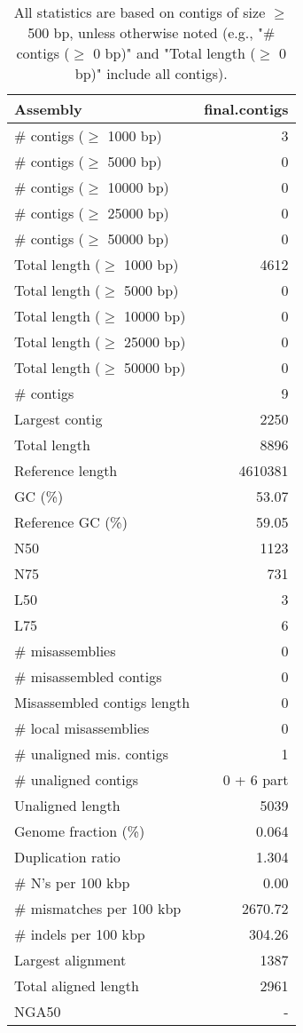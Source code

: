 \documentclass[12pt,a4paper]{article}
\begin{document}
\begin{table}[ht]
\begin{center}
\caption{All statistics are based on contigs of size $\geq$ 500 bp, unless otherwise noted (e.g., "\# contigs ($\geq$ 0 bp)" and "Total length ($\geq$ 0 bp)" include all contigs).}
\begin{tabular}{|l*{1}{|r}|}
\hline
Assembly & final.contigs \\ \hline
\# contigs ($\geq$ 1000 bp) & 3 \\ \hline
\# contigs ($\geq$ 5000 bp) & 0 \\ \hline
\# contigs ($\geq$ 10000 bp) & 0 \\ \hline
\# contigs ($\geq$ 25000 bp) & 0 \\ \hline
\# contigs ($\geq$ 50000 bp) & 0 \\ \hline
Total length ($\geq$ 1000 bp) & 4612 \\ \hline
Total length ($\geq$ 5000 bp) & 0 \\ \hline
Total length ($\geq$ 10000 bp) & 0 \\ \hline
Total length ($\geq$ 25000 bp) & 0 \\ \hline
Total length ($\geq$ 50000 bp) & 0 \\ \hline
\# contigs & 9 \\ \hline
Largest contig & 2250 \\ \hline
Total length & 8896 \\ \hline
Reference length & 4610381 \\ \hline
GC (\%) & 53.07 \\ \hline
Reference GC (\%) & 59.05 \\ \hline
N50 & 1123 \\ \hline
N75 & 731 \\ \hline
L50 & 3 \\ \hline
L75 & 6 \\ \hline
\# misassemblies & 0 \\ \hline
\# misassembled contigs & 0 \\ \hline
Misassembled contigs length & 0 \\ \hline
\# local misassemblies & 0 \\ \hline
\# unaligned mis. contigs & 1 \\ \hline
\# unaligned contigs & 0 + 6 part \\ \hline
Unaligned length & 5039 \\ \hline
Genome fraction (\%) & 0.064 \\ \hline
Duplication ratio & 1.304 \\ \hline
\# N's per 100 kbp & 0.00 \\ \hline
\# mismatches per 100 kbp & 2670.72 \\ \hline
\# indels per 100 kbp & 304.26 \\ \hline
Largest alignment & 1387 \\ \hline
Total aligned length & 2961 \\ \hline
NGA50 & - \\ \hline
\end{tabular}
\end{center}
\end{table}
\end{document}
